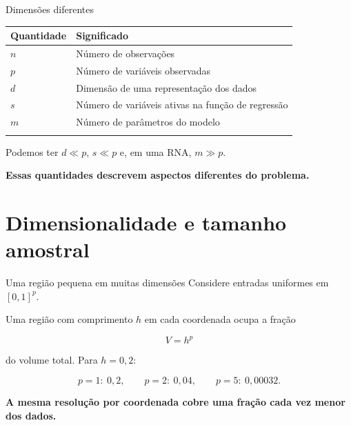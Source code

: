 \documentclass[
  10pt,
  ignorenonframetext,
  aspectratio=169,
  brazilian,
]{beamer}
\newcounter{none} %
\begin{document}
\begin{frame}{Dimensões diferentes}
\protect{}\label{dimensuxf5es-diferentes}
{\def\LTcaptype{none} %
\begin{longtable}[]{@{}ll@{}}
\toprule\noalign{}
Quantidade & Significado \\
\midrule\noalign{}
\endhead
\(n\) & Número de observações \\
\(p\) & Número de variáveis observadas \\
\(d\) & Dimensão de uma representação dos dados \\
\(s\) & Número de variáveis ativas na função de regressão \\
\(m\) & Número de parâmetros do modelo \\
\bottomrule\noalign{}
\end{longtable}
}

Podemos ter \(d\ll p\), \(s\ll p\) e, em uma RNA, \(m\gg p\).

\textbf{Essas quantidades descrevem aspectos diferentes do problema.}

\end{frame}

\section{Dimensionalidade e tamanho
amostral}\label{dimensionalidade-e-tamanho-amostral}

\begin{frame}{Uma região pequena em muitas dimensões}
\protect{}\label{uma-regiuxe3o-pequena-em-muitas-dimensuxf5es}
Considere entradas uniformes em \([0,1]^p\).

Uma região com comprimento \(h\) em cada coordenada ocupa a fração

\[
\boxed{V=h^p}
\]

do volume total. Para \(h=0{,}2\):

\[
p=1:\ 0{,}2,\qquad
p=2:\ 0{,}04,\qquad
p=5:\ 0{,}00032.
\]

\textbf{A mesma resolução por coordenada cobre uma fração cada vez menor
dos dados.}

\end{frame}
\end{document}
